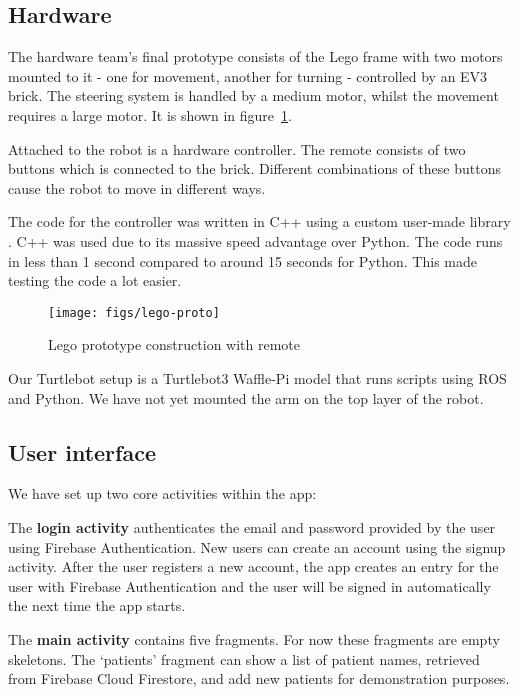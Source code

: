 \documentclass{article}
\begin{document}
\subsection{Hardware}

The hardware team's final prototype consists of the Lego frame with two motors mounted to it - one for movement, another for turning - controlled by an EV3 brick. The steering system is handled by a medium motor, whilst the movement requires a large motor. It is shown in figure~\ref{fig:lego-proto}.

Attached to the robot is a hardware controller. The remote consists of two buttons which is connected to the brick. Different combinations of these buttons cause the robot to move in different ways.

The code for the controller was written in C++ using a custom user-made library \cite{cpp}. C++ was used due to its massive speed advantage over Python. The code runs in less than 1 second compared to around 15 seconds for Python. This made testing the code a lot easier.

\begin{figure}[tb]
\vskip 5mm
\begin{center}
\centerline{\texttt{[image: figs/lego-proto]}}
\caption{Lego prototype construction with remote}
\label{fig:lego-proto}
\end{center}
\vskip -5mm
\end{figure}

Our Turtlebot setup is a Turtlebot3 Waffle-Pi model that runs scripts using ROS and Python. We have not yet mounted the arm on the top layer of the robot. 

\subsection{User interface}
We have set up two core activities within the app:

The {\bf login activity} authenticates the email and password provided by the user using Firebase Authentication. New users can create an account using the signup activity. After the user registers a new account, the app creates an entry for the user with Firebase Authentication and the user will be signed in automatically the next time the app starts.

The {\bf main activity} contains five fragments. For now these fragments are empty skeletons. The `patients' fragment can show a list of patient names, retrieved from Firebase Cloud Firestore, and add new patients for demonstration purposes.
\end{document}
